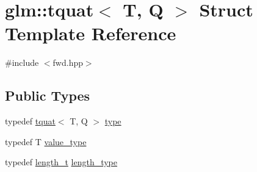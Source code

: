 \hypertarget{structglm_1_1tquat}{}\section{glm\+:\+:tquat$<$ T, Q $>$ Struct Template Reference}
\label{structglm_1_1tquat}


{\ttfamily \#include $<$fwd.\+hpp$>$}

\subsection*{Public Types}
\begin{DoxyCompactItemize}
\item 
typedef \hyperlink{structglm_1_1tquat}{tquat}$<$ T, Q $>$ \hyperlink{structglm_1_1tquat_ae9600f57e83d084305f1c801150fbd36}{type}
\item 
typedef T \hyperlink{structglm_1_1tquat_ac02efd34879e12e77f5143df3708b070}{value\+\_\+type}
\item 
typedef \hyperlink{namespaceglm_a090a0de2260835bee80e71a702492ed9}{length\+\_\+t} \hyperlink{structglm_1_1tquat_a6d9ab28781d7835b30216a996484c026}{length\+\_\+type}
\end{DoxyCompactItemize}
